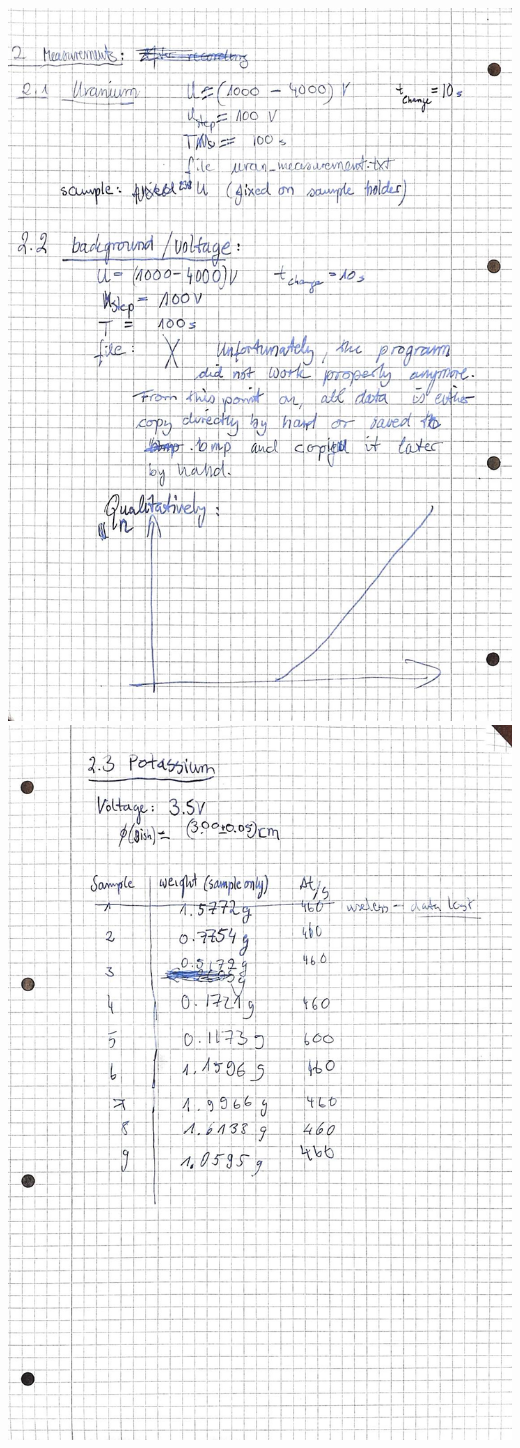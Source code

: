    \includegraphics[width=\linewidth]{records/page2.jpeg}
\clearpage
    \includegraphics[width=\linewidth]{records/page3.jpeg}
\clearpage

